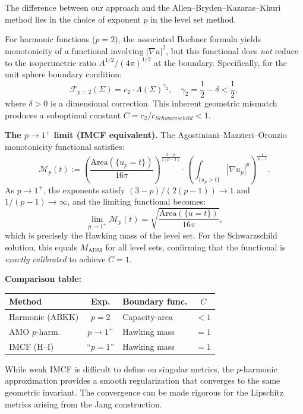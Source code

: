 \begin{remark}\label{rem:WhySharp}
The difference between our approach and the Allen--Bryden--Kazaras--Khuri method lies in the choice of exponent $p$ in the level set method.

For harmonic functions ($p = 2$), the associated Bochner formula yields monotonicity of a functional involving $|\nabla u|^2$, but this functional does \emph{not} reduce to the isoperimetric ratio $A^{1/2}/(4\pi)^{1/2}$ at the boundary. Specifically, for the unit sphere boundary condition:
\[
\mathcal{F}_{p=2}(\Sigma) = c_2 \cdot A(\Sigma)^{\gamma_2}, \quad \gamma_2 = \frac{1}{2} - \delta < \frac{1}{2},
\]
where $\delta > 0$ is a dimensional correction. This inherent geometric mismatch produces a suboptimal constant $C = c_2/c_{Schwarzschild} < 1$.

\textbf{The $p \to 1^+$ limit (IMCF equivalent).} The Agostiniani--Mazzieri--Oronzio monotonicity functional satisfies:
\[
\mathcal{M}_p(t) := \left( \frac{\mathrm{Area}(\{u_p = t\})}{16\pi} \right)^{\frac{3-p}{2(p-1)}} \cdot \left( \int_{\{u_p > t\}} |\nabla u_p|^p \right)^{\frac{1}{p-1}}.
\]
As $p \to 1^+$, the exponents satisfy $(3-p)/(2(p-1)) \to 1$ and $1/(p-1) \to \infty$, and the limiting functional becomes:
\[
\lim_{p \to 1^+} \mathcal{M}_p(t) = \sqrt{\frac{\mathrm{Area}(\{u = t\})}{16\pi}},
\]
which is precisely the Hawking mass of the level set. For the Schwarzschild solution, this equals $M_{\mathrm{ADM}}$ for all level sets, confirming that the functional is \emph{exactly calibrated} to achieve $C = 1$.

\textbf{Comparison table:}
\begin{center}
\renewcommand{\arraystretch}{1.3}
\small
\begin{tabular}{|p{3cm}|c|p{3cm}|c|}
\hline
\textbf{Method} & \textbf{Exp.} & \textbf{Boundary func.} & \textbf{$C$} \\
\hline
Harmonic (ABKK) & $p = 2$ & Capacity-area & $< 1$ \\
AMO $p$-harm. & $p \to 1^+$ & Hawking mass & $= 1$ \\
IMCF (H--I) & ``$p = 1$'' & Hawking mass & $= 1$ \\
\hline
\end{tabular}
\end{center}

\noindent While weak IMCF is difficult to define on singular metrics, the $p$-harmonic approximation provides a smooth regularization that converges to the same geometric invariant. The convergence can be made rigorous for the Lipschitz metrics arising from the Jang construction.
\end{remark}

